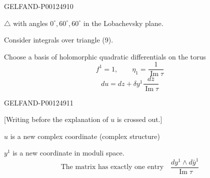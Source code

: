 \begin{GelfandAdjacentEvidence}{GELFAND-P001249}{10}

$\triangle$ with angles \underline{$0^{\circ},60^{\circ},60^{\circ}$} in the Lobachevsky plane.

Consider integrals over triangle (9).

Choose a basis of holomorphic quadratic differentials on the torus
\begin{equation*}
f^1=1,\qquad \eta_1=\frac{1}{\operatorname{Im}\tau}\tag{10}
\end{equation*}
\begin{equation*}
du=dz+\delta y^1\frac{d\bar z}{\operatorname{Im}\tau}
\end{equation*}
\end{GelfandAdjacentEvidence}
\begin{GelfandAdjacentEvidence}{GELFAND-P001249}{11}

[Writing before the explanation of $u$ is crossed out.]
\end{GelfandAdjacentEvidence}

$u$ is a new complex coordinate (complex structure)

$y^1$ is a new coordinate in moduli space.
\begin{equation*}
\text{The matrix has exactly one entry}\quad
\frac{dy^1\wedge d\bar y^1}{\operatorname{Im}\tau}\tag{11}
\end{equation*}


